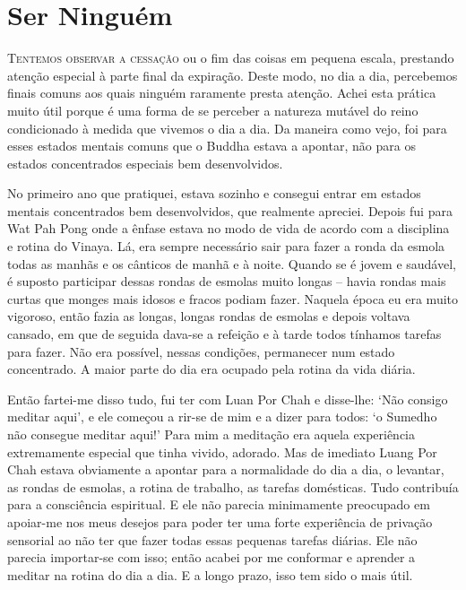 \chapter{Ser Ninguém}

\lettrine{T}{entemos observar a cessação} ou o fim das coisas em pequena escala,
prestando atenção especial à parte final da expiração. Deste modo, no dia a dia,
percebemos finais comuns aos quais ninguém raramente presta atenção. Achei esta
prática muito útil porque é uma forma de se perceber a natureza mutável do reino
condicionado à medida que vivemos o dia a dia. Da maneira como vejo, foi para
esses estados mentais comuns que o Buddha estava a apontar, não para os estados
concentrados especiais bem desenvolvidos.

No primeiro ano que pratiquei, estava sozinho e consegui entrar em estados
mentais concentrados bem desenvolvidos, que realmente apreciei. Depois fui para
Wat Pah Pong onde a ênfase estava no modo de vida de acordo com a disciplina e
rotina do Vinaya. Lá, era sempre necessário sair para fazer a ronda da esmola
todas as manhãs e os cânticos de manhã e à noite. Quando se é jovem e saudável,
é suposto participar dessas rondas de esmolas muito longas -- havia rondas mais
curtas que monges mais idosos e fracos podiam fazer. Naquela época eu era muito
vigoroso, então fazia as longas, longas rondas de esmolas e depois voltava
cansado, em que de seguida dava-se a refeição e à tarde todos tínhamos tarefas
para fazer. Não era possível, nessas condições, permanecer num estado
concentrado. A maior parte do dia era ocupado pela rotina da vida diária.

Então fartei-me disso tudo, fui ter com Luan Por Chah e disse-lhe: `Não
consigo meditar aqui', e ele começou a rir-se de mim e a dizer para todos: `o
Sumedho não consegue meditar aqui!' Para mim a meditação era aquela experiência
extremamente especial que tinha vivido, adorado. Mas de imediato Luang Por Chah
estava obviamente a apontar para a normalidade do dia a dia, o levantar, as
rondas de esmolas, a rotina de trabalho, as tarefas domésticas. Tudo contribuía
para a consciência espiritual. E ele não parecia minimamente preocupado em
apoiar-me nos meus desejos para poder ter uma forte experiência de privação
sensorial ao não ter que fazer todas essas pequenas tarefas diárias. Ele não
parecia importar-se com isso; então acabei por me conformar e aprender a
meditar na rotina do dia a dia. E a longo prazo, isso tem sido o mais útil.

